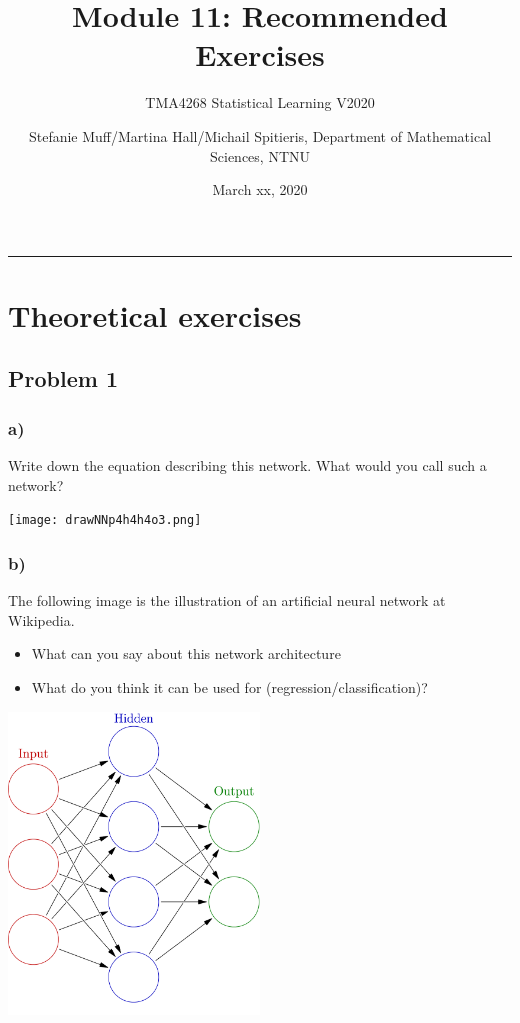 \documentclass[]{article}
\title{Module 11: Recommended Exercises}
\subtitle{TMA4268 Statistical Learning V2020}
\author{Stefanie Muff/Martina Hall/Michail Spitieris, Department of Mathematical
Sciences, NTNU}
\date{March xx, 2020}
\providecommand{\tightlist}{%
  \setlength{\itemsep}{0pt}\setlength{\parskip}{0pt}}
\begin{document}
\maketitle

{
\hypersetup{linkcolor=black}
\setcounter{tocdepth}{2}
\tableofcontents
}
\begin{center}\rule{0.5\linewidth}{\linethickness}\end{center}

\section{Theoretical exercises}\label{theoretical-exercises}

\subsection{Problem 1}\label{problem-1}

\subsubsection{a)}\label{a}

Write down the equation describing this network. What would you call
such a network?

\centering
\texttt{[image: drawNNp4h4h4o3.png]}

\flushleft

\subsubsection{b)}\label{b}

The following image is the illustration of an artificial neural network
at Wikipedia.

\begin{itemize}
\tightlist
\item
  What can you say about this network architecture
\item
  What do you think it can be used for (regression/classification)?
\end{itemize}

\centering
\includegraphics[width=0.50000\textwidth]{Colored_neural_network.png}
\end{document}

